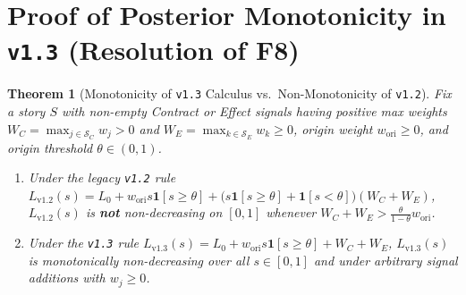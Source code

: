 \documentclass[10pt,twocolumn,letterpaper]{article}
\makeatletter
\theoremstyle{plain}
\newtheorem{theorem}{Theorem}[section]
\theoremstyle{definition}
\theoremstyle{remark}
\DeclareRobustCommand{\_}{\ifmmode\nfss@text{\textunderscore}\else\textunderscore\penalty\@highpenalty\hskip\z@skip\fi}
\makeatother
\begin{document}
\section{Proof of Posterior Monotonicity in \texttt{v1.3} (Resolution of F8)}
\label{app:monotone}

\begin{theorem}[Monotonicity of \texttt{v1.3} Calculus vs.\ Non-Monotonicity of \texttt{v1.2}]
\label{thm:monotone}
Fix a story $S$ with non-empty Contract or Effect signals having positive max weights $W_C = \max_{j \in \mathcal{S}_C} w_j > 0$ and $W_E = \max_{k \in \mathcal{S}_E} w_k \ge 0$, origin weight $w_{\text{ori}} \ge 0$, and origin threshold $\theta \in (0, 1)$.
\begin{enumerate}[leftmargin=1.5em,itemsep=1.5pt,topsep=2pt]
  \item Under the legacy \texttt{v1.2} rule $L_{\text{v1.2}}(s) = L_0 + w_{\text{ori}} s \mathbf{1}[s \ge \theta] + \big(s \mathbf{1}[s \ge \theta] + \mathbf{1}[s < \theta]\big)(W_C + W_E)$, $L_{\text{v1.2}}(s)$ is \textbf{not} non-decreasing on $[0, 1]$ whenever $W_C + W_E > \frac{\theta}{1 - \theta} w_{\text{ori}}$.
  \item Under the \texttt{v1.3} rule $L_{\text{v1.3}}(s) = L_0 + w_{\text{ori}} s \mathbf{1}[s \ge \theta] + W_C + W_E$, $L_{\text{v1.3}}(s)$ is monotonically non-decreasing over all $s \in [0, 1]$ and under arbitrary signal additions with $w_j \ge 0$.
\end{enumerate}
\end{theorem}
\end{document}
